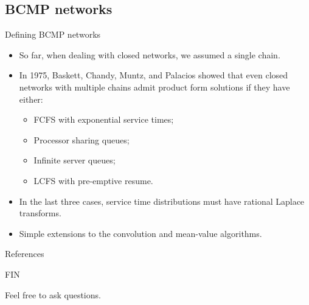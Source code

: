 \documentclass[serif, xcolor={svgnames, table}, usepdftitle=false]{beamer}
\begin{document}
\subsection{BCMP networks}
\begin{frame}{Defining BCMP networks}
  \begin{itemize}
  \item So far, when dealing with closed networks, we assumed a single chain.
  \item In 1975, Baskett, Chandy, Muntz, and Palacios showed that even closed
    networks with multiple chains admit product form solutions if they have
    either:
    \begin{itemize}
    \item FCFS with exponential service times;
    \item Processor sharing queues;
    \item Infinite server queues;
    \item LCFS with pre-emptive resume.
    \end{itemize}
  \item In the last three cases, service time distributions must have rational
    Laplace transforms.
  \item Simple extensions to the convolution and mean-value algorithms.
  \end{itemize}
\end{frame}

\begin{frame}{References}
  \printbibliography[heading=none]
\end{frame}

\begin{frame}[plain, c]
  \begin{center}
    FIN

    Feel free to ask questions.
  \end{center}
\end{frame}
\end{document}
